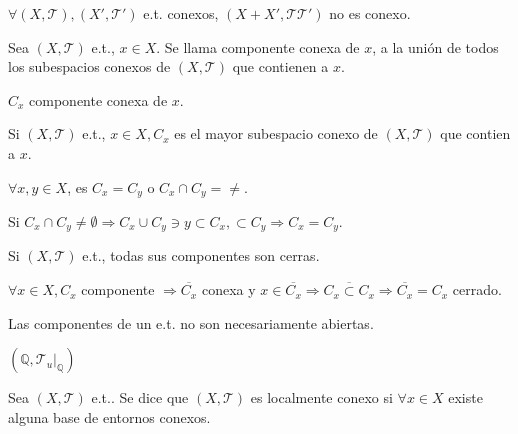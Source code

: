 \begin{obs}
  $\forall ( X, \mathcal{T} ), ( X', \mathcal{T}' )$ e.t. conexos, $( X + X', \mathcal{T} \mathcal{T}' )$ no es conexo.
\end{obs}

\begin{defn}
  Sea $( X, \mathcal{T} )$ e.t., $x \in X$. Se llama componente conexa de $x$, a la unión de todos los subespacios conexos de $( X, \mathcal{T} )$ que contienen a $x$.
\end{defn}

\begin{nota}
  $C_{x}$ componente conexa de $x$.
\end{nota}

\begin{obs}
  Si $( X, \mathcal{T} )$ e.t., $x \in X, C_{x}$ es el mayor subespacio conexo de $( X, \mathcal{T} )$ que contien a $x$.
\end{obs}

\begin{obs}
  $\forall x, y \in X$, es $C_{x} = C_{y}$ o $C_{x} \cap C_{y} = \neq$.
\end{obs}

\begin{dem}
  Si $C_{x} \cap C_{y} \neq \emptyset \Rightarrow C_{x} \cup C_{y} \ni y \subset C_{x}, \subset C_{y} \Rightarrow C_{x} = C_{y}$.
\end{dem}

\begin{prop}
  Si $( X, \mathcal{T} )$ e.t., todas sus componentes son cerras.
\end{prop}

\begin{dem}
  $\forall x \in X, C_{x}$ componente $\Rightarrow \overline{C_{x}}$ conexa y $x \in \overline{C_{x}} \Rightarrow \overline{C_{x} \subset C_{x}} \Rightarrow \overline{C_{x}} = C_{x}$ cerrado.
\end{dem}

\begin{obs}
  Las componentes de un e.t. no son necesariamente abiertas.
\end{obs}

\begin{ejm}
  $( \mathbb{Q}, \mathcal{T}_{u}|_{\mathbb{Q}})$
\end{ejm}

\begin{defn}
  Sea $( X, \mathcal{T} )$ e.t.. Se dice que $( X, \mathcal{T} )$ es localmente conexo si $\forall x \in X$ existe alguna base de entornos conexos.
\end{defn}

